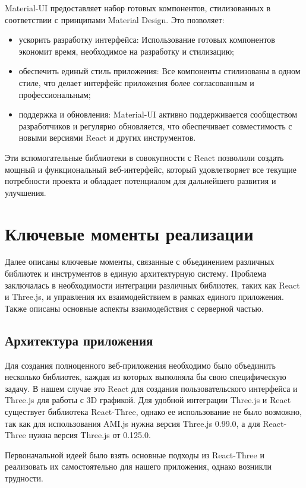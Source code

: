 Material-UI предоставляет набор готовых компонентов, стилизованных в соответствии с принципами Material Design. Это позволяет:

\begin{itemize}
    \item ускорить разработку интерфейса: Использование готовых компонентов экономит время, необходимое на разработку и стилизацию;
    \item обеспечить единый стиль приложения: Все компоненты стилизованы в одном стиле, что делает интерфейс приложения более согласованным и профессиональным;
    \item поддержка и обновления: Material-UI активно поддерживается сообществом разработчиков и регулярно обновляется, что обеспечивает совместимость с новыми версиями React и других инструментов.
\end{itemize}

Эти вспомогательные библиотеки в совокупности с React позволили создать мощный и функциональный веб-интерфейс, который удовлетворяет все текущие потребности проекта и обладает потенциалом для дальнейшего развития и улучшения.

\section{Ключевые моменты реализации}

Далее описаны ключевые моменты, связанные с объединением различных библиотек и инструментов в единую архитектурную систему. Проблема заключалась в необходимости интеграции различных библиотек, таких как React и Three.js, и управления их взаимодействием в рамках единого приложения. Также описаны основные аспекты взаимодействия с серверной частью.

\subsection{Архитектура приложения}

Для создания полноценного веб-приложения необходимо было объединить несколько библиотек, каждая из которых выполняла бы свою специфическую задачу. В нашем случае это React для создания пользовательского интерфейса и Three.js для работы с 3D графикой. Для удобной интеграции Three.js и React существует библиотека React-Three, однако ее использование не было возможно, так как для использования AMI.js нужна версия Three.js 0.99.0, а для React-Three нужна версия Three.js от 0.125.0.

Первоначальной идеей было взять основные подходы из React-Three и реализовать их самостоятельно для нашего приложения, однако возникли трудности.

